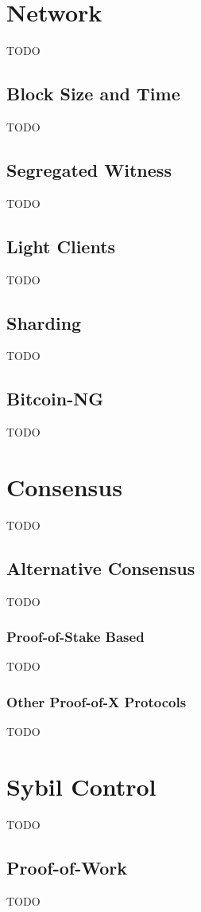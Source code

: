 \documentclass{article}
\begin{document}
\section{Network}
TODO

\subsection{Block Size and Time}
TODO

\subsection{Segregated Witness}
TODO

\subsection{Light Clients}
TODO

\subsection{Sharding}
TODO

\subsection{Bitcoin-NG}
TODO


\section{Consensus}
TODO

\subsection{Alternative Consensus}
TODO

\subsubsection{Proof-of-Stake Based}
TODO

\subsubsection{Other Proof-of-X Protocols}
TODO


\section{Sybil Control}
TODO

\subsection{Proof-of-Work}
TODO
\end{document}
